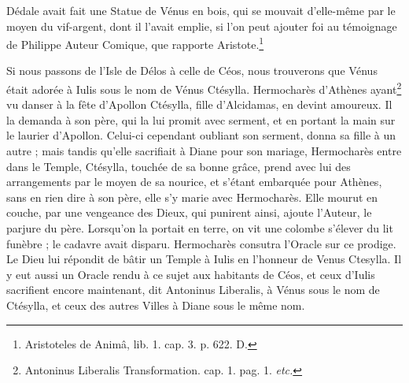 \documentclass[a4paper, 11pt, oneside, polutonikogreek, french]{article}
\begin{document}
Dédale avait fait une Statue de Vénus en bois, qui se mouvait d'elle-même par le moyen du vif-argent, dont il l'avait emplie, si l'on peut ajouter foi au témoignage de Philippe Auteur Comique, que rapporte Aristote.\footnote{Aristoteles de Animâ, lib. 1. cap. 3. p. 622. D.}

Si nous passons de l'Isle de Délos à celle de Céos, nous trouverons que Vénus était adorée à Iulis sous le nom de Vénus Ctésylla. Hermocharès d'Athènes ayant\footnote{Antoninus Liberalis Transformation. cap. 1. pag. 1. \emph{etc.}} vu danser à la fête d'Apollon Ctésylla, fille d'Alcidamas, en devint amoureux. Il la demanda à son père, qui la lui promit avec serment, et en portant la main sur le laurier d'Apollon. Celui-ci cependant oubliant son serment, donna sa fille à un autre ; mais tandis qu'elle sacrifiait à Diane pour son mariage, Hermocharès entre dans le Temple, Ctésylla, touchée de sa bonne grâce, prend avec lui des arrangements par le moyen de sa nourice, et s'étant embarquée pour Athènes, sans en rien dire à son père, elle s'y marie avec Hermocharès. Elle mourut en couche, par une vengeance des Dieux, qui punirent ainsi, ajoute l'Auteur, le parjure du père. Lorsqu'on la portait en terre, on vit une colombe s'élever du lit funèbre ; le cadavre avait disparu. Hermocharès consutra l'Oracle sur ce prodige. Le Dieu lui répondit de bâtir un Temple à Iulis en l'honneur de Venus Ctesylla. Il y eut aussi un Oracle rendu à ce sujet aux habitants de Céos, et ceux d'Iulis sacrifient encore maintenant, dit Antoninus Liberalis, à Vénus sous le nom de Ctésylla, et ceux des autres Villes à Diane sous le même nom.
\end{document}
